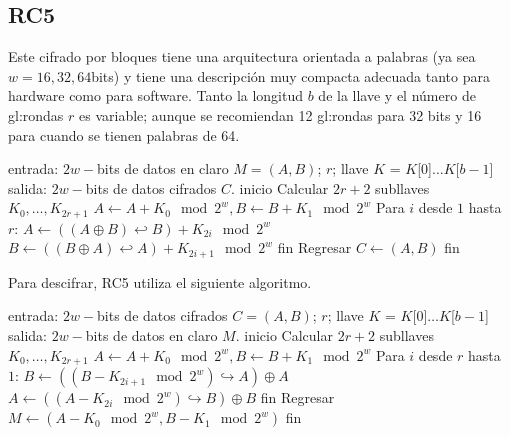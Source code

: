 \subsection{RC5}
Este cifrado por bloques tiene una arquitectura orientada a palabras (ya
sea $w = 16, 32, 64$bits) y tiene una descripción muy compacta adecuada
tanto para hardware como para software. Tanto la longitud $b$ de la
llave y el número de \glspl{gl:ronda} $r$ es variable; aunque se recomiendan 12
\glspl{gl:ronda} para 32 bits y 16 para cuando se tienen palabras de 64.

\begin{pseudocodigo}[caption={RC5, cifrado.}, label={rc5:1}]
  entrada:  $2w-$bits de datos en claro $M = (A, B)$; $r$;
      llave $K$ = $K$[0]$\dots K$[$b-1$]
  salida:   $2w-$bits de datos cifrados $C$.
  inicio
    Calcular $2r + 2$ subllaves $K_0, \dots, K_{2r+1}$
    $A \leftarrow A + K_0 \mod2^w, B \leftarrow B + K_1 \mod2^w$
    Para $i$ desde $1$ hasta $r$:
      $A \leftarrow ((A \oplus B) \hookleftarrow B) + K_{2i} \mod2^w$
      $B \leftarrow ((B \oplus A) \hookleftarrow A) + K_{2i+1} \mod2^w$
    fin
    Regresar $C \leftarrow (A,B)$
  fin
\end{pseudocodigo}

Para descifrar, RC5 utiliza el siguiente algoritmo.
\begin{pseudocodigo}[caption={RC5, descifrado.}, label={rc5:2}]
  entrada:  $2w-$bits de datos cifrados $C = (A, B)$; $r$;
      llave $K$ = $K$[0]$\dots K$[$b-1$]
  salida:   $2w-$bits de datos en claro $M$.
  inicio
    Calcular $2r + 2$ subllaves $K_0, \dots, K_{2r+1}$
    $A \leftarrow A + K_0 \mod2^w, B \leftarrow B + K_1 \mod2^w$
    Para $i$ desde $r$ hasta $1$:
      $B \leftarrow ((B - K_{2i+1} \mod2^w) \hookrightarrow A) \oplus A$
      $A \leftarrow ((A - K_{2i} \mod2^w) \hookrightarrow B) \oplus B$
    fin
    Regresar $M \leftarrow (A-K_0 \mod2^w, B-K_1 \mod2^w)$
  fin
\end{pseudocodigo}
